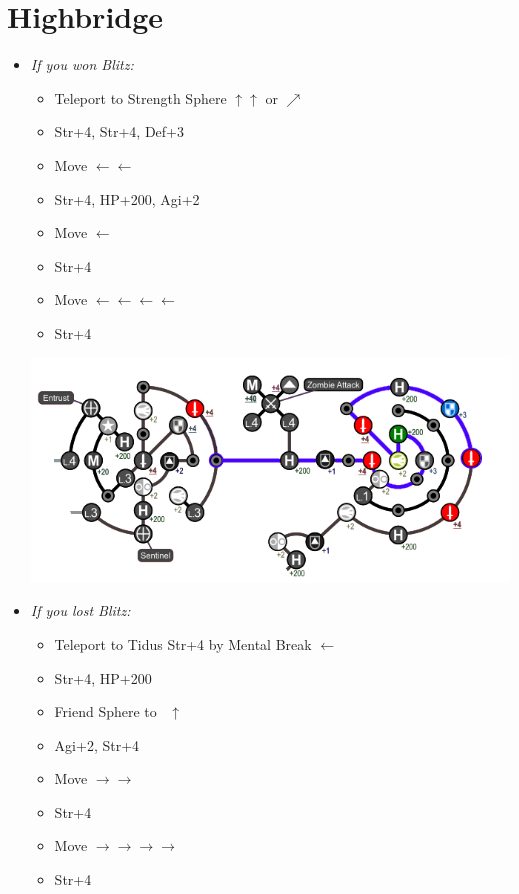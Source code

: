 \chapter{Highbridge}
\begin{spheregrid}
  \begin{itemize}
    \yunaf
    \item \textit{If you won Blitz:}
          \begin{itemize}
            \item Teleport to Strength Sphere $\uparrow\uparrow$ or $\nearrow$
            \item Str+4, Str+4, Def+3
            \item Move $\leftarrow\leftarrow$
            \item Str+4, HP+200, Agi+2
            \item Move $\leftarrow$
            \item Str+4
            \item Move $\leftarrow\leftarrow\leftarrow\leftarrow$
            \item Str+4
          \end{itemize}
          \includegraphics[width=.9\columnwidth]{graphics/Yuna_blitz_win_1}
    \item \textit{If you lost Blitz:}
          \begin{itemize}
            \item Teleport to Tidus Str+4 by Mental Break $\leftarrow$
            \item Str+4, HP+200
            \item Friend Sphere to \tidus\ $\uparrow$
            \item Agi+2, Str+4
            \item Move $\rightarrow\rightarrow$
            \item Str+4
            \item Move $\rightarrow\rightarrow\rightarrow\rightarrow$
            \item Str+4

\end{itemize}
\end{itemize}
\end{spheregrid}
